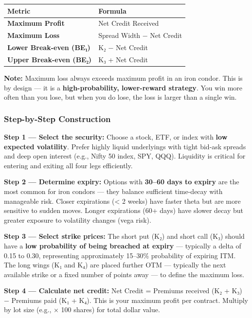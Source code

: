 \documentclass[12pt,openany]{book}
\begin{document}
\begin{center}
\scriptsize
\setlength{\tabcolsep}{3pt}
\begin{tabular}{|L{6.00cm}|L{6.00cm}|}
\hline
Metric & Formula \\
\hline
\textbf{Maximum Profit} & Net Credit Received \\
\hline
\textbf{Maximum Loss} & Spread Width − Net Credit \\
\hline
\textbf{Lower Break-even (BE₁)} & K₂ − Net Credit \\
\hline
\textbf{Upper Break-even (BE₂)} & K₃ + Net Credit \\
\hline
\end{tabular}
\end{center}

\textbf{Note:} Maximum loss always exceeds maximum profit in an iron condor. This is by design — it is a \textbf{high-probability, lower-reward strategy}. You win more often than you lose, but when you do lose, the loss is larger than a single win.



\subsubsection{Step-by-Step Construction}

\textbf{Step 1 — Select the security:} Choose a stock, ETF, or index with \textbf{low expected volatility}. Prefer highly liquid underlyings with tight bid-ask spreads and deep open interest (e.g., Nifty 50 index, SPY, QQQ). Liquidity is critical for entering and exiting all four legs efficiently.

\textbf{Step 2 — Determine expiry:} Options with \textbf{30–60 days to expiry} are the most common for iron condors — they balance sufficient time-decay with manageable risk. Closer expirations (< 2 weeks) have faster theta but are more sensitive to sudden moves. Longer expirations (60+ days) have slower decay but greater exposure to volatility changes (vega risk).

\textbf{Step 3 — Select strike prices:} The short put (K₂) and short call (K₃) should have a \textbf{low probability of being breached at expiry} — typically a delta of 0.15 to 0.30, representing approximately 15–30\% probability of expiring ITM. The long wings (K₁ and K₄) are placed further OTM — typically the next available strike or a fixed number of points away — to define the maximum loss.

\textbf{Step 4 — Calculate net credit:} Net Credit = Premiums received (K₂ + K₃) − Premiums paid (K₁ + K₄). This is your maximum profit per contract. Multiply by lot size (e.g., × 100 shares) for total dollar value.
\end{document}
